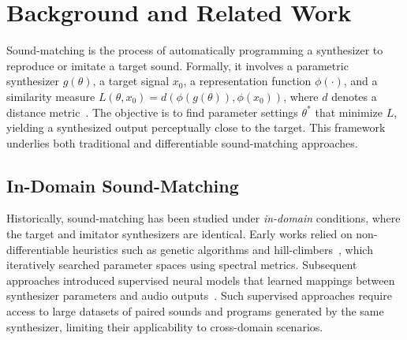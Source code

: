 \documentclass[runningheads]{llncs}
\begin{document}
\section{Background and Related Work}
\label{sec:background}

Sound-matching is the process of automatically programming a synthesizer to reproduce or imitate a target sound.  
Formally, it involves a parametric synthesizer $g(\theta)$, a target signal $x_0$, a representation function $\phi(\cdot)$, and a similarity measure $L(\theta, x_0) = d(\phi(g(\theta)), \phi(x_0))$, where $d$ denotes a distance metric~\cite{vahidi2023mesostructures,han2023perceptual,salimi2025evaluating}.  
The objective is to find parameter settings $\theta^*$ that minimize $L$, yielding a synthesized output perceptually close to the target.  
This framework underlies both traditional and differentiable sound-matching approaches.

\subsection{In-Domain Sound-Matching}
Historically, sound-matching has been studied under \emph{in-domain} conditions, where the target and imitator synthesizers are identical.  
Early works relied on non-differentiable heuristics such as genetic algorithms and hill-climbers~\cite{horner1993machine,mitchell2007evolutionary}, which iteratively searched parameter spaces using spectral metrics.  
Subsequent approaches introduced supervised neural models that learned mappings between synthesizer parameters and audio outputs~\cite{yee2018automatic,esling2019flow,masuda2021soundmatch}. Such supervised approaches require access to large datasets of paired sounds and programs generated by the same synthesizer, limiting their applicability to cross-domain scenarios.
\end{document}

